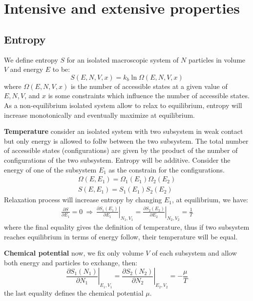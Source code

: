 \documentclass{article}
\begin{document}
\section{Intensive and extensive properties}
\subsection{Entropy}
We define entropy $S$ for an isolated macroscopic system of $N$ particles in volume $V$ and energy $E$ to be:
\begin{equation}
    S(E,N,V,x) = k_b \ln\Omega(E,N,V,x)
\end{equation}
where $\Omega(E,N,V,x)$ is the number of accessible states at a given value of $E, N, V$, and $x$ is some constraints which 
influence the number of accessible states.
As a non-equilibrium isolated system allow to relax to equilibrium, entropy will increase monotonically and eventually maximize 
at equilibrium.

\textbf{Temperature} 
consider an isolated system with two subsystem in weak contact but only energy is allowed to follw between the two subsystem.
The total number of accessible states (configurations) are given by the product of the number of configurations of the 
two subsystem. Entropy will be additive. Consider the energy of one of the subsystem $E_1$
as the constrain for the configurations.
\begin{align}
    \Omega(E,E_1) = \Omega_1(E_1) \Omega_2(E_2) \\
    S(E,E_1) = S_1(E_1) S_2(E_2)   
\end{align}
Relaxation process will increase entropy by changing $E_1$, at equilibrium, we have:
\begin{gather}
    \frac{\partial S}{\partial E_1} = 0 \ \Rightarrow \ 
    \left. \frac{\partial S_1(E_1)}{\partial E_1} \right|_{N_1,V_1} = \left. \frac{\partial S_2(E_2)}{\partial E_2}\right|_{N_2,V_2} = \frac{1}{T}
\end{gather}
where the final equality gives the definition of temperature, thus if two subsystem reaches equilibrium in terms of energy follow, their 
temperature will be equal.

\textbf{Chemical potential}
now, we fix only volume $V$ of each subsystem and allow both energy and particles to exchange, then:
\begin{equation}
    \left. \frac{\partial S_1(N_1)}{\partial N_1} \right|_{E_1,V_1} = \left. \frac{\partial S_2(N_2)}{\partial N_2}\right|_{E_2,V_2} = -\frac{\mu}{T}
\end{equation}
the last equality defines the chemical potential $\mu$. 
\end{document}
